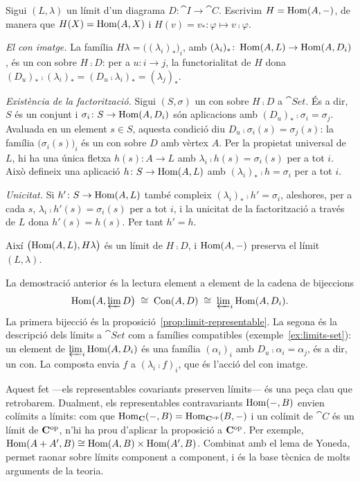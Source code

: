 \begin{prova}
Sigui $(L,\lambda)$ un límit d'un diagrama $D\colon\cat{I}\to\cat{C}$. Escrivim $H=\operatorname{Hom}(A,-)$, de manera que $H(X)=\operatorname{Hom}(A,X)$ i $H(v)=v_*\colon\varphi\mapsto v\comp\varphi$.

\emph{El con imatge.} La família $H\lambda=\bigl((\lambda_i)_*\bigr)_i$, amb $(\lambda_i)_*\colon\operatorname{Hom}(A,L)\to\operatorname{Hom}(A,D_i)$, és un con sobre $H\comp D$: per a $u\colon i\to j$, la functorialitat de $H$ dona $(D_u)_*\comp(\lambda_i)_*=(D_u\comp\lambda_i)_*=(\lambda_j)_*$.

\emph{Existència de la factorització.} Sigui $(S,\sigma)$ un con sobre $H\comp D$ a $\cat{Set}$. És a dir, $S$ és un conjunt i $\sigma_i\colon S\to\operatorname{Hom}(A,D_i)$ són aplicacions amb $(D_u)_*\comp\sigma_i=\sigma_j$. Avaluada en un element $s\in S$, aquesta condició diu $D_u\comp\sigma_i(s)=\sigma_j(s)$: la família $\bigl(\sigma_i(s)\bigr)_i$ és un con sobre $D$ amb vèrtex $A$. Per la propietat universal de $L$, hi ha una única fletxa $h(s)\colon A\to L$ amb $\lambda_i\comp h(s)=\sigma_i(s)$ per a tot $i$. Això defineix una aplicació $h\colon S\to\operatorname{Hom}(A,L)$ amb $(\lambda_i)_*\comp h=\sigma_i$ per a tot $i$.

\emph{Unicitat.} Si $h'\colon S\to\operatorname{Hom}(A,L)$ també compleix $(\lambda_i)_*\comp h'=\sigma_i$, aleshores, per a cada $s$, $\lambda_i\comp h'(s)=\sigma_i(s)$ per a tot $i$, i la unicitat de la factorització a través de $L$ dona $h'(s)=h(s)$. Per tant $h'=h$.

Així $\bigl(\operatorname{Hom}(A,L),H\lambda\bigr)$ és un límit de $H\comp D$, i $\operatorname{Hom}(A,-)$ preserva el límit $(L,\lambda)$.
\end{prova}

\begin{observacio}
La demostració anterior és la lectura element a element de la cadena de bijeccions
\[
\operatorname{Hom}\bigl(A,\varprojlim D\bigr)\;\cong\;\mathrm{Con}(A,D)\;\cong\;\varprojlim\nolimits_i\operatorname{Hom}(A,D_i).
\]
La primera bijecció és la proposició~\ref{prop:limit-representable}. La segona és la descripció dels límits a $\cat{Set}$ com a famílies compatibles (exemple~\ref{ex:limits-set}): un element de $\varprojlim_i\operatorname{Hom}(A,D_i)$ és una família $(\alpha_i)_i$ amb $D_u\comp\alpha_i=\alpha_j$, és a dir, un con. La composta envia $f$ a $(\lambda_i\comp f)_i$, que és l'acció del con imatge.
\end{observacio}

\begin{observacio}
Aquest fet ---els representables covariants preserven límits--- és una peça clau que retrobarem. Dualment, els representables contravariants $\operatorname{Hom}(-,B)$ envien colímits a límits: com que $\operatorname{Hom}_{\mathbf{C}}(-,B)=\operatorname{Hom}_{\mathbf{C}^{\mathrm{op}}}(B,-)$ i un colímit de $\cat{C}$ és un límit de $\mathbf{C}^{\mathrm{op}}$, n'hi ha prou d'aplicar la proposició a $\mathbf{C}^{\mathrm{op}}$. Per exemple, $\operatorname{Hom}(A+A',B)\cong\operatorname{Hom}(A,B)\times\operatorname{Hom}(A',B)$. Combinat amb el lema de Yoneda, permet raonar sobre límits component a component, i és la base tècnica de molts arguments de la teoria.
\end{observacio}


